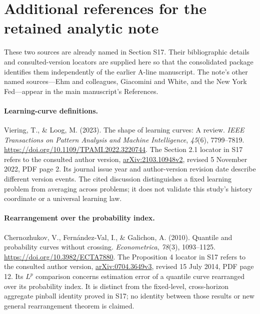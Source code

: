 \clearpage
\section*{Additional references for the retained analytic note}
These two sources are already named in Section S17. Their bibliographic details
and consulted-version locators are supplied here so that the consolidated
package identifies them independently of the earlier A-line manuscript.
The note's other named sources---Ehm and colleagues, Giacomini and White, and
the New York Fed---appear in the main manuscript's References.

\paragraph{Learning-curve definitions.}
Viering, T., \& Loog, M. (2023). The shape of learning curves: A review.
\emph{IEEE Transactions on Pattern Analysis and Machine Intelligence},
\emph{45}(6), 7799--7819. \url{https://doi.org/10.1109/TPAMI.2022.3220744}.
The Section 2.1 locator in S17 refers to the consulted author version,
\href{https://arxiv.org/abs/2103.10948v2}{arXiv:2103.10948v2}, revised
5 November 2022, PDF page 2. Its journal issue year and author-version revision
date describe different version events. The cited discussion distinguishes a
fixed learning problem from averaging across problems; it does not validate
this study's history coordinate or a universal learning law.

\paragraph{Rearrangement over the probability index.}
Chernozhukov, V., Fern\'andez-Val, I., \& Galichon, A. (2010).
Quantile and probability curves without crossing.
\emph{Econometrica}, \emph{78}(3), 1093--1125.
\url{https://doi.org/10.3982/ECTA7880}.
The Proposition 4 locator in S17 refers to the consulted author version,
\href{https://arxiv.org/abs/0704.3649v3}{arXiv:0704.3649v3}, revised
15 July 2014, PDF page 12. Its \(L^p\) comparison concerns estimation error
of a quantile curve rearranged over its probability index. It is distinct from
the fixed-level, cross-horizon aggregate pinball identity proved in S17;
no identity between those results or new general rearrangement theorem is claimed.
